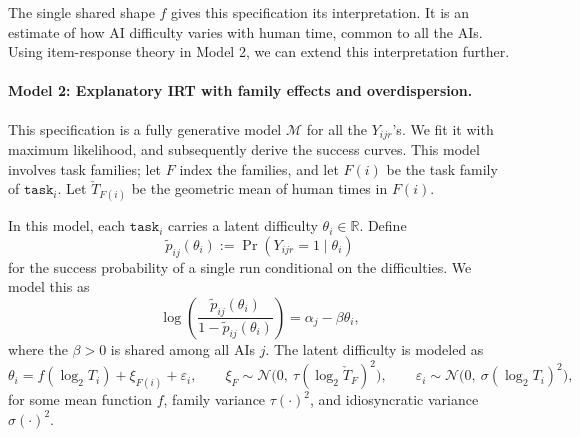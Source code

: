 \documentclass{article}
\theoremstyle{definition}
\newcommand{\thq}[1][q]{\mathbf{th}_{#1}}
\newcommand{\task}{\texttt{task}}
\begin{document}
The single shared shape $f$ gives this specification its interpretation. It is an estimate of how AI difficulty varies with human time, common to all the AIs. Using item-response theory in Model 2, we can extend this interpretation further.


\paragraph{Model 2: Explanatory IRT with family effects and overdispersion.} This specification is a fully generative model $\mathcal{M}$ for all the $Y_{ijr}$'s. We fit it with maximum likelihood, and subsequently derive the success curves. This model involves task families; let $F$ index the families, and let $F(i)$ be the task family of $\task_i$. Let $\check T_{{F(i)}}$ be the geometric mean of human times in $F(i)$. 


In this model, each $\task_i$ carries a latent difficulty $\theta_i \in \mathbb{R}$. Define
\[
    \tilde p_{ij}(\theta_i) := \Pr(Y_{ijr} = 1 \mid \theta_i)
\]
for the success probability of a single run conditional on the difficulties. We model this as
\[
    \log\left(
      \frac{\tilde p_{ij}(\theta_i)}{1 - \tilde p_{ij}(\theta_i)}
    \right) = \alpha_j - \beta \theta_i,
\]
where the $\beta > 0$ is shared among all AIs $j$. The latent difficulty is modeled as
\[
    \theta_i = f(\log_2 T_i) + \xi_{F(i)} + \varepsilon_i,
    \qquad
    \xi_F \sim \mathcal{N}\big(0,\ \tau(\log_2 \check T_F)^2\big),
    \qquad
    \varepsilon_i \sim \mathcal{N}\big(0,\ \sigma(\log_2 T_i)^2\big),
\]
for some mean function $f$, family variance $\tau(\cdot)^2$, and idiosyncratic variance $\sigma(\cdot)^2$. 
\end{document}
